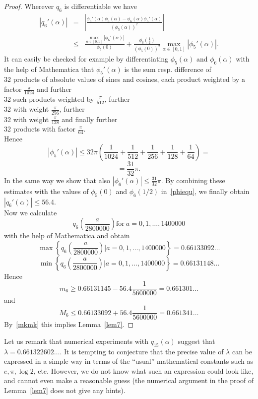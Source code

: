 \documentclass[12pt]{amsart}
\begin{document}
\begin{proof}
Wherever $q_{6}$ is differentiable we have
\begin{eqnarray}
\left|{q_{6}}' (\alpha)\right| & = & \left|\frac{{\phi_{6}}' (\alpha) \phi_{5} (\alpha) - \phi_{6} (\alpha) {\phi_{5}}' (\alpha)}{\left(\phi_{5}(\alpha)\right)^{2}}\right| \nonumber\\
& \leq & \frac{\underset{\alpha \in \left[0,1\right]}{\max} \left|{\phi_{6}}' (\alpha)\right|}{\phi_{5}(0)} + \frac{\phi_{6} \left(\frac{1}{2}\right)}{\left(\phi_{5} (0)\right)^{2}} \underset{\alpha \in \left[0,1\right]}{\max} \left|{\phi_{5}}'(\alpha)\right|. \label{phiequ}
\end{eqnarray}
It can easily be checked for example by differentiating $\phi_{5} (\alpha)$ and $\phi_{6}(\alpha)$ with the help of Mathematica that ${\phi_{5}}' (\alpha)$ is the sum resp. difference of\\
32 products of absolute values of sines and cosines, each product weighted by a factor $\frac{\pi}{1024}$ and further\\
32 such products weighted by $\frac{\pi}{512}$, further\\
32 with weight $\frac{\pi}{256}$, further\\
32 with weight $\frac{\pi}{128}$ and finally further\\
32 products with factor $\frac{\pi}{64}$.\\
Hence
$$\left|{\phi_{5}}' (\alpha)\right| \leq 32 \pi \left(\frac{1}{1024}+ \frac{1}{512} + \frac{1}{256} + \frac{1}{128} + \frac{1}{64}\right)=$$
$$=\frac{31}{32} \pi.$$
In the same way we show that also $\left|{\phi_{6}}'(\alpha)\right|\leq \frac{31}{32} \pi$. By combining these estimates with the values of $\phi_5(0)$ and $\phi_6(1/2)$ in~\eqref{phiequ}, we finally obtain  $\left|{q_{6}}' (\alpha)\right|\leq 56.4$.\\

Now we calculate
$$
q_{6} \left(\frac{a}{2800000}\right) \mbox{for}~ a=0,1, \ldots, 1400000
$$
with the help of Mathematica and obtain
$$
\max\left\{q_{6} \left(\frac{a}{2800000}\right) \bigg\vert a=0,1, \ldots, 1400000\right\} = 0.66133092 \ldots
$$
$$
\min\left\{q_{6} \left(\frac{a}{2800000}\right) \bigg\vert a=0,1, \ldots, 1400000\right\}= 0.66131148 \ldots
$$
Hence
$$
m_{6} \geq 0.66131145 - 56.4 \frac{1}{5600000} = 0.661301 \ldots
$$
and
$$
M_{6} \leq 0.66133092 + 56.4 \frac{1}{5600000} = 0.661341 \ldots
$$
By~\eqref{mkmk} this implies Lemma~\ref{lem7}.
\end{proof}
Let us remark that numerical experiments with $q_{15} (\alpha)$ suggest that $\lambda=0.661322602 \ldots.$ It is tempting to conjecture that the precise value of $\lambda$ can be expressed in a simple way in terms of the ``usual'' mathematical constants such as $e,\pi, \log 2$, etc. However, we do not know what such an expression could look like, and cannot even make a reasonable guess (the numerical argument in the proof of Lemma~\ref{lem7} does not give any hints).\\
\end{document}
